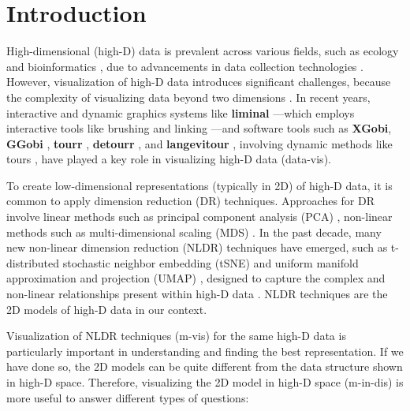 \documentclass[
  12pt]{article}
\begin{document}
\newpage
{} %

\ifdefined\Shaded\renewenvironment{Shaded}{\begin{tcolorbox}[breakable, frame hidden, interior hidden, boxrule=0pt, borderline west={3pt}{0pt}{shadecolor}, sharp corners, enhanced]}{\end{tcolorbox}}\fi

\hypertarget{sec-intro}{%
\section{Introduction}\label{sec-intro}}

High-dimensional (high-D) data is prevalent across various fields, such
as ecology and bioinformatics \citep{Guo2023}, due to advancements in
data collection technologies \citep{Johnstone2009, ayesha2020overview}.
However, visualization of high-D data introduces significant challenges,
because the complexity of visualizing data beyond two dimensions
\citep{Jia2022}. In recent years, interactive and dynamic graphics
systems like \textbf{liminal} \citep{article21} ---which employs
interactive tools like brushing and linking \citep{article58}---and
software tools such as \textbf{XGobi}, \textbf{GGobi} \citep{article60},
\textbf{tourr} \citep{article61}, \textbf{detourr} \citep{article22},
and \textbf{langevitour} \citep{article09}, involving dynamic methods
like tours \citep{Asimov1985}, have played a key role in visualizing
high-D data (data-vis).

To create low-dimensional representations (typically in 2D) of high-D
data, it is common to apply dimension reduction (DR) techniques.
Approaches for DR involve linear methods such as principal component
analysis (PCA) \citep{Karl1901}, non-linear methods such as
multi-dimensional scaling (MDS) \citep{Torgerson1967}. In the past
decade, many new non-linear dimension reduction (NLDR) techniques have
emerged, such as t-distributed stochastic neighbor embedding (tSNE)
\citep{Laurens2008} and uniform manifold approximation and projection
(UMAP) \citep{Leland2018}, designed to capture the complex and
non-linear relationships present within high-D data
\citep{Johnstone2009}. NLDR techniques are the 2D models of high-D data
in our context.

Visualization of NLDR techniques (m-vis) \citep{article59} for the same
high-D data is particularly important in understanding and finding the
best representation. If we have done so, the 2D models can be quite
different from the data structure shown in high-D space. Therefore,
visualizing the 2D model in high-D space (m-in-dis) is more useful to
answer different types of questions:
\end{document}
